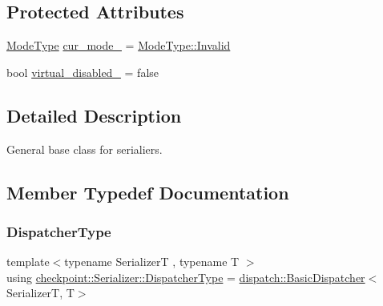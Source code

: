 \subsection*{Protected Attributes}
\begin{DoxyCompactItemize}
\item 
\hyperlink{namespacecheckpoint_ae2509499ccd8b1dc48fb535bf8aa3059}{Mode\+Type} \hyperlink{structcheckpoint_1_1_serializer_a89a1f207ad5ff75654cb6d48f432be37}{cur\+\_\+mode\+\_\+} = \hyperlink{namespacecheckpoint_ae2509499ccd8b1dc48fb535bf8aa3059a4bbb8f967da6d1a610596d7257179c2b}{Mode\+Type\+::\+Invalid}
\item 
bool \hyperlink{structcheckpoint_1_1_serializer_a46ef3c0da77d80853882a7cad641c2af}{virtual\+\_\+disabled\+\_\+} = false
\end{DoxyCompactItemize}


\subsection{Detailed Description}
General base class for serialiers. 

\subsection{Member Typedef Documentation}
\mbox{\label{structcheckpoint_1_1_serializer_ad8effc5884f1ed37b6b4507422f6d72c}} 
\subsubsection{\texorpdfstring{Dispatcher\+Type}{DispatcherType}}
{\footnotesize\ttfamily template$<$typename SerializerT , typename T $>$ \\
using \hyperlink{structcheckpoint_1_1_serializer_ad8effc5884f1ed37b6b4507422f6d72c}{checkpoint\+::\+Serializer\+::\+Dispatcher\+Type} =  \hyperlink{structcheckpoint_1_1dispatch_1_1_basic_dispatcher}{dispatch\+::\+Basic\+Dispatcher}$<$SerializerT, T$>$}

\mbox{\label{structcheckpoint_1_1_serializer_a4c307e2592dc4224d8a13148109c5764}} 
